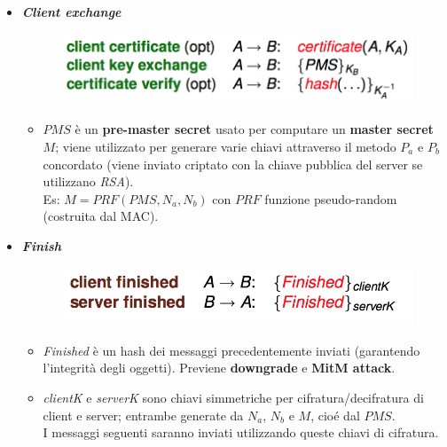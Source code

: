 \documentclass[11pt, a4paper, twoside, italian]{report}
\theoremstyle{plain}
\begin{document}
\begin{multicols}{2}
\begin{itemize}
	\item \textit{\textbf{Client exchange}}
	\begin{figure}[H]
		\centering
		\includegraphics[scale=0.55]{sslclientexchange}
	\end{figure}
	\begin{itemize}
		\item $PMS$ è un \textbf{pre-master secret} usato per computare un \textbf{master secret} $M$; viene utilizzato per generare varie chiavi attraverso il metodo $P_a$ e $P_b$ concordato (viene inviato criptato con la chiave pubblica del server se utilizzano \textit{RSA}).\\
		Es: $M = PRF(PMS, N_{a}, N_{b})$ con $PRF$ funzione pseudo-random (costruita dal MAC).
	\end{itemize}
\end{itemize}
\columnbreak
\begin{itemize}
	\item \textit{\textbf{Finish}}
	\begin{figure}[H]
		\centering
		\includegraphics[scale=0.55]{sslfinish}
	\end{figure}
	\begin{itemize}
		\item \textit{Finished} è un hash dei messaggi precedentemente inviati (garantendo l'integrità degli oggetti). Previene \textbf{downgrade} e \textbf{MitM attack}.
		\item \textit{clientK} e \textit{serverK} sono chiavi simmetriche per cifratura/decifratura di client e server; entrambe generate da $N_a$, $N_b$ e $M$, cioé dal $PMS$.\\
		I messaggi seguenti saranno inviati utilizzando queste chiavi di cifratura.
	\end{itemize}
\end{itemize}
\end{multicols}
\end{document}
